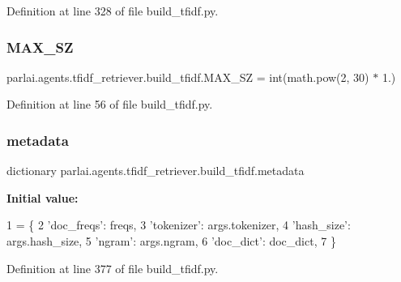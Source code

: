 Definition at line 328 of file build\+\_\+tfidf.\+py.

\mbox{\label{namespaceparlai_1_1agents_1_1tfidf__retriever_1_1build__tfidf_ae004cad36f1e393ce6c158058a526eeb}} 
\subsubsection{\texorpdfstring{M\+A\+X\+\_\+\+SZ}{MAX\_SZ}}
{\footnotesize\ttfamily parlai.\+agents.\+tfidf\+\_\+retriever.\+build\+\_\+tfidf.\+M\+A\+X\+\_\+\+SZ = int(math.\+pow(2, 30) $\ast$ 1.)}



Definition at line 56 of file build\+\_\+tfidf.\+py.

\mbox{\label{namespaceparlai_1_1agents_1_1tfidf__retriever_1_1build__tfidf_a78c951c63ece0474919ceef5d15d7e5d}} 
\subsubsection{\texorpdfstring{metadata}{metadata}}
{\footnotesize\ttfamily dictionary parlai.\+agents.\+tfidf\+\_\+retriever.\+build\+\_\+tfidf.\+metadata}

{\bfseries Initial value\+:}
\begin{DoxyCode}
1 =  \{
2         \textcolor{stringliteral}{'doc\_freqs'}: freqs,
3         \textcolor{stringliteral}{'tokenizer'}: args.tokenizer,
4         \textcolor{stringliteral}{'hash\_size'}: args.hash\_size,
5         \textcolor{stringliteral}{'ngram'}: args.ngram,
6         \textcolor{stringliteral}{'doc\_dict'}: doc\_dict,
7     \}
\end{DoxyCode}


Definition at line 377 of file build\+\_\+tfidf.\+py.

